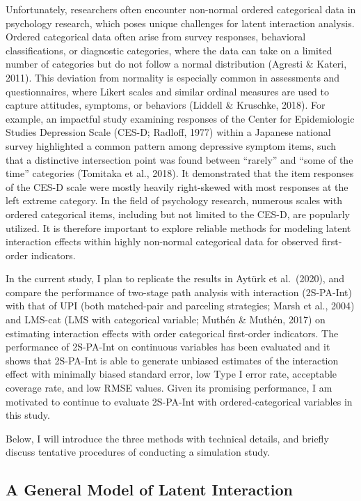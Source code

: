 \documentclass[
  man]{apa6}
\begin{document}
Unfortunately, researchers often encounter non-normal ordered categorical data in psychology research, which poses unique challenges for latent interaction analysis. Ordered categorical data often arise from survey responses, behavioral classifications, or diagnostic categories, where the data can take on a limited number of categories but do not follow a normal distribution (Agresti \& Kateri, 2011). This deviation from normality is especially common in assessments and questionnaires, where Likert scales and similar ordinal measures are used to capture attitudes, symptoms, or behaviors (Liddell \& Kruschke, 2018). For example, an impactful study examining responses of the Center for Epidemiologic Studies Depression Scale (CES-D; Radloff, 1977) within a Japanese national survey highlighted a common pattern among depressive symptom items, such that a distinctive intersection point was found between ``rarely'' and ``some of the time'' categories (Tomitaka et al., 2018). It demonstrated that the item responses of the CES-D scale were mostly heavily right-skewed with most responses at the left extreme category. In the field of psychology research, numerous scales with ordered categorical items, including but not limited to the CES-D, are popularly utilized. It is therefore important to explore reliable methods for modeling latent interaction effects within highly non-normal categorical data for observed first-order indicators.

In the current study, I plan to replicate the results in Aytürk et al.~(2020), and compare the performance of two-stage path analysis with interaction (2S-PA-Int) with that of UPI (both matched-pair and parceling strategies; Marsh et al., 2004) and LMS-cat (LMS with categorical variable; Muthén \& Muthén, 2017) on estimating interaction effects with order categorical first-order indicators. The performance of 2S-PA-Int on continuous variables has been evaluated and it shows that 2S-PA-Int is able to generate unbiased estimates of the interaction effect with minimally biased standard error, low Type I error rate, acceptable coverage rate, and low RMSE values. Given its promising performance, I am motivated to continue to evaluate 2S-PA-Int with ordered-categorical variables in this study.

Below, I will introduce the three methods with technical details, and briefly discuss tentative procedures of conducting a simulation study.

\hypertarget{a-general-model-of-latent-interaction}{%
\subsection{A General Model of Latent Interaction}\label{a-general-model-of-latent-interaction}}
\end{document}
